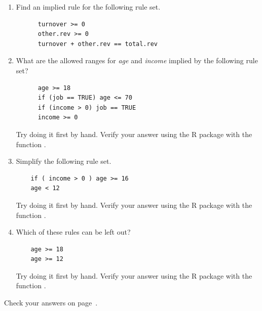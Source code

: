 \begin{enumerate}
\begin{verbatim}
  \end{verbatim}
  \begin{enumerate}
    \item Read the help file of the dataset: .
    \item Work through the introductory example of the `data validation cookbook' 
    \item Create a new textfile
    \item Define at least 10 rules for the  dataset
    \item Provide rationales in comments
    \item Read, and  rules with data
    \item Summarize and plot the results.
    \item Use  and  to convert and display the results.
    \item Make a  of the  object.
    \item (Bonus) If you are familiar with : create a data quality report.
  \end{enumerate}

\item Find an implied rule for the following rule set.
  \begin{verbatim}
      turnover >= 0
      other.rev >= 0
      turnover + other.rev == total.rev
  \end{verbatim}
\item What are the allowed ranges for \emph{age} and \emph{income} implied by
the following rule set?
  \begin{verbatim}
      age >= 18
      if (job == TRUE) age <= 70
      if (income > 0) job == TRUE
      income >= 0
  \end{verbatim}
Try doing it first by hand. Verify your answer using the  R package
with the function .
\item Simplify the following rule set.
  \begin{verbatim}
    if ( income > 0 ) age >= 16
    age < 12
  \end{verbatim}
Try doing it first by hand. Verify your answer using the  R package
with the function .
\item Which of these rules can be left out?
  \begin{verbatim}
    age >= 18
    age >= 12
  \end{verbatim}
Try doing it first by hand. Verify your answer using the  R package
with the function .
\end{enumerate}

\hfill{}Check your answers on page~\pageref{sect:ansvalidation}.


